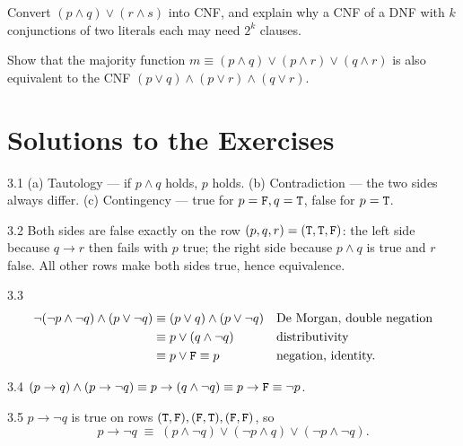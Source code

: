 \begin{exercise}{\hard}
Convert $(p \wedge q) \vee (r \wedge s)$ into CNF, and explain why a CNF of a
DNF with $k$ conjunctions of two literals each may need $2^k$ clauses.
\end{exercise}

\begin{exercise}{\hard}
Show that the majority function
$m \equiv (p\wedge q) \vee (p\wedge r) \vee (q\wedge r)$ is also equivalent to
the CNF $(p \vee q) \wedge (p \vee r) \wedge (q \vee r)$.
\end{exercise}

\section*{Solutions to the Exercises}

\begin{solution}{3.1}
(a) Tautology --- if $p \wedge q$ holds, $p$ holds. (b) Contradiction --- the
two sides always differ. (c) Contingency --- true for $p=\mathtt{F}, q=\mathtt{T}$, false
for $p=\mathtt{T}$.
\end{solution}

\begin{solution}{3.2}
Both sides are false exactly on the row $(p,q,r) = (\mathtt{T},\mathtt{T},\mathtt{F})$: the left
side because $q \to r$ then fails with $p$ true; the right side because
$p \wedge q$ is true and $r$ false. All other rows make both sides true,
hence equivalence.
\end{solution}

\begin{solution}{3.3}
\begin{align*}
\neg(\neg p \wedge \neg q) \wedge (p \vee \neg q)
&\equiv (p \vee q) \wedge (p \vee \neg q) && \text{De Morgan, double negation}\\
&\equiv p \vee (q \wedge \neg q) && \text{distributivity}\\
&\equiv p \vee \mathtt{F} \equiv p && \text{negation, identity.}
\end{align*}
\end{solution}

\begin{solution}{3.4}
$(p \to q) \wedge (p \to \neg q) \equiv p \to (q \wedge \neg q)
\equiv p \to \mathtt{F} \equiv \neg p$.
\end{solution}

\begin{solution}{3.5}
$p \to \neg q$ is true on rows $(\mathtt{T},\mathtt{F}), (\mathtt{F},\mathtt{T}), (\mathtt{F},\mathtt{F})$, so
\[
p \to \neg q \;\equiv\;
(p \wedge \neg q) \vee (\neg p \wedge q) \vee (\neg p \wedge \neg q).
\]
\end{solution}

